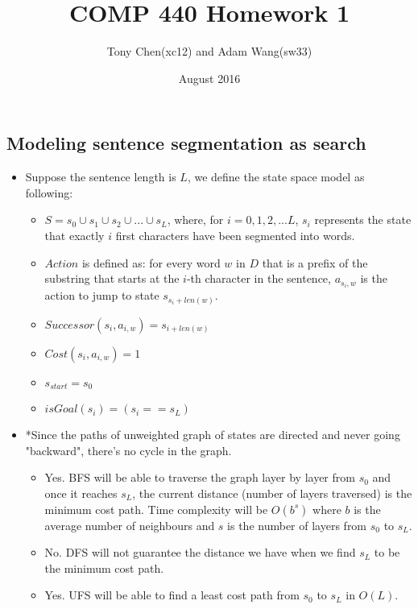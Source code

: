 \documentclass[11pt]{article}
\title{COMP 440 Homework 1}
\author{Tony Chen(xc12) and Adam Wang(sw33)}
\date{August 2016}
\begin{document}
\begin{onehalfspace}
    \maketitle
    \newpage{}
    \section{Modeling sentence segmentation as search}
    \begin{itemize}
        \item
        Suppose the sentence length is $L$, we define the state space model as following:
        \begin{itemize}
            \item
            $S = s_0\cup s_1\cup s_2\cup ... \cup s_L$, where, for $i = 0, 1, 2, ... L$, $s_i$ represents the state that exactly $i$ first characters have been segmented into words.
            \item
            $Action$ is defined as: for every word $w$ in $D$ that is a prefix of the substring that starts at the $i$-th character in the sentence, $a_{s_i,w}$ is the action to jump to state $s_{s_i+len(w)}$.
            \item
            $Successor(s_i, a_{i,w}) = s_{i+len(w)}$
            \item
            $Cost(s_i, a_{i,w}) = 1$
            \item
            $s_{start} = s_0$
            \item
            $isGoal(s_i) = (s_i == s_L)$
        \end{itemize}
        \item
        *Since the paths of unweighted graph of states are directed and never going "backward", there's no cycle in the graph.
        \begin{itemize}
            \item
            Yes. BFS will be able to traverse the graph layer by layer from $s_0$ and once it reaches $s_L$, the current distance (number of layers traversed) is the minimum cost path. Time complexity will be $O(b^s)$ where $b$ is the average number of neighbours and $s$ is the number of layers from $s_0$ to $s_L$.
            \item
            No. DFS will not guarantee the distance we have when we find $s_L$ to be the minimum cost path.
            \item
            Yes. UFS will be able to find a least cost path from $s_0$ to $s_L$ in $O(L)$.

\end{itemize}
\end{itemize}
\end{onehalfspace}
\end{document}

